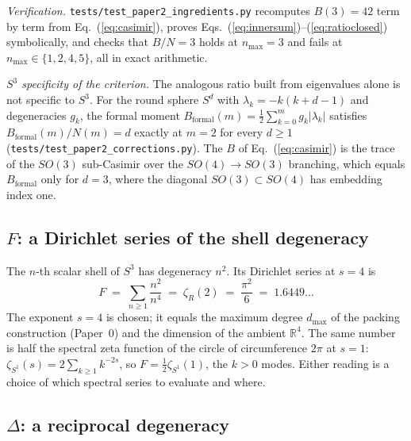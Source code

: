 \documentclass[aps,prl,twocolumn,superscriptaddress]{revtex4-2}
\newcommand{\gvq}[2]{#2}
\begin{document}
\emph{Verification.} \texttt{tests/test\_paper2\_ingredients.py}
recomputes $B(3) = 42$ term by term from Eq.~(\ref{eq:casimir}), proves
Eqs.~(\ref{eq:innersum})--(\ref{eq:ratioclosed}) symbolically, and
checks that $B/N = 3$ holds at $n_{\max} = 3$ and fails at
$n_{\max} \in \{1,2,4,5\}$, all in exact arithmetic.

\emph{$S^3$ specificity of the criterion.} The analogous ratio built
from eigenvalues alone is not specific to $S^3$. For the round sphere
$S^d$ with $\lambda_k = -k(k+d-1)$ and degeneracies $g_k$, the formal
moment $B_{\mathrm{formal}}(m) = \tfrac12\sum_{k=0}^{m} g_k|\lambda_k|$
satisfies $B_{\mathrm{formal}}(m)/N(m) = d$ exactly at $m = 2$ for every
$d \ge 1$~\cite{phase6_hopf} (\texttt{tests/test\_paper2\_corrections.py}).
The $B$ of Eq.~(\ref{eq:casimir}) is the trace of the $SO(3)$
sub-Casimir over the $SO(4) \to SO(3)$ branching, which equals
$B_{\mathrm{formal}}$ only for $d = 3$, where the diagonal
$SO(3) \subset SO(4)$ has embedding index one.

\subsection{$F$: a Dirichlet series of the shell degeneracy}

The $n$-th scalar shell of $S^3$ has degeneracy $n^2$. Its Dirichlet
series at $s = 4$ is
\begin{equation}\label{eq:F_dirichlet}
  F \;=\; \sum_{n\geq 1}\frac{n^2}{n^{4}}
    \;=\; \zeta_R(2) \;=\; \frac{\pi^2}{6} \;=\; \gvq{f_fock_dirichlet}{1.6449}\ldots
\end{equation}
The exponent $s = 4$ is chosen; it equals the maximum degree $d_{\max}$
of the packing construction (Paper~0) and the dimension of the ambient
$\mathbb{R}^4$. The same number is half the spectral zeta function of
the circle of circumference $2\pi$ at $s = 1$:
$\zeta_{S^1}(s) = 2\sum_{k\ge1}k^{-2s}$, so
$F = \tfrac12\zeta_{S^1}(1)$, the $k > 0$ modes. Either reading is a
choice of which spectral series to evaluate and where.

\subsection{$\Delta$: a reciprocal degeneracy}
\end{document}
